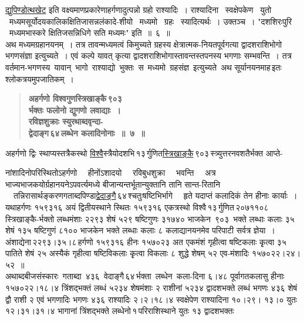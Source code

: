 \documentclass[11pt, openany]{book}
\begin{document}
\hyperref[1.6]{द्युपिण्डोत्थखेट} \;इति \;वक्ष्यमाणप्रकारेणाहर्गणादुत्पन्नो \;ग्रहो \;राश्यादिः~। राश्यादिना ~स्वक्षेपकेण ~युतो ~मध्यमसूर्योदयकालिकक्षितिजासन्नलंकादे-शीयो ~मध्यमो ~ग्रहः ~स्यादित्यर्थः~। उक्तञ्च~। "{\color{violet}दशशिरःपुरि ~मध्यमभास्करे क्षितिजसन्निधिगे सति मध्यमः}" इति~॥~६~॥\\

अथ मध्यमग्रहानयनम्~। तत्र तावन्मध्यमत्वं किमुच्यते ग्रहस्य क्षेत्रात्मक-नियतपूर्वगत्या द्वादशराशिभोगो भगणसंज्ञा इत्युच्यते~। एवं कल्पे यावत् कृत्या द्वादशराशिभोगास्तावन्तस्तपनस्य भगणाः सम्भवन्ति~। तत्र वर्तमान-भगणस्य \,यावान् \,भागो \,राश्याद्यो \,भुक्तः \,स \,मध्यमो \,ग्रहसंज्ञ \,इत्युच्यते \,अथ सूर्यानयनमाह\textendash \,इतः श्लोकत्रयमुपजातिकम्~।

 \label{1.7}
\begin{quote}
{\large \textbf{{\color{purple}अहर्गणो विश्वगुणस्त्रिखाङ्कै\textendash \,९०३\textendash \\
र्भक्तः फलोनो द्युगणो लवाद्याः~।\\
रविज्ञशुक्राः स्युरथाब्दवृन्दा-\\
द्वेदाङ्ग\textendash \,६४\textendash \,लब्धेन कलादिनोनाः~॥~७~॥}}}
\end{quote}

अहर्गणो द्विः स्थाप्यस्तत्रैकस्थो \hyperref[1.7]{विश्वै}स्त्रैयोदशभि\textendash \,१३\textendash \,र्गुणित\hyperref[1.7]{स्त्रिखाङ्कै}\textendash \,९०३\textendash \,स्त्र्युत्तरनवशतैर्भक्त आप्ते-

\newpage

\noindent नांशादिनोपरिस्थितोऽहर्गणो ~~हीनोंऽशादयो ~~रविबुधशुक्रा ~~भवन्ति ~~अत्र भाज्यभाजकयोर्ग्रहानयनेऽपवर्त्यमध्ये बीजान्यन्तर्भूतान्युक्तानि तानि सान्त-रितानि ~~तन्निरासार्थङ्करणगताब्दपिण्डा\hyperref[1.7]{द्वेदाङ्गै}\textendash \,६४\textendash \,श्चतुःषष्टिभिर्भागे ~~हृते यदाप्तं कलादिकं तेन हीनाः कार्याः~। यथाहर्गणः १५९३१६ अयं द्वितीयस्थाने स्थितः १५९३१६ एकत्रस्थो विश्वै\textendash \,१३\textendash \,र्गुणित\textendash \,२०७११०८\textendash \,स्त्रिखाङ्कै-र्भक्तो \;लब्धमंशाः \;२२९३ \;शेषं \;५२९ \;षष्टिगुणः \;३१७४० \;भाजकेन \,९०३ \,भक्ते लब्धाः कलाः ३५ शेषं १३५ षष्टिगुणं ८१०० भाजकेन भक्ते लब्धाः कलाः ८ कलाद्यानयनमेव परिपाटी सर्वत्र ज्ञेया~। अंशाद्येना\textendash \,२२९३।३५।८\textendash \,हर्गणो १५९३१६ हीनः १५७०२३ अत एकमंशं गृहीत्वा षष्टिकलाः कृृत्वा ३५ पातिते शेषं २५ अस्यैकं गृहीत्वा षष्टिविकलाः कृृत्वा विकलाः ८ शुद्धे शेषम् ५२ एव-मंशादिः १५७०२२।२४।५२~॥\\

अथाब्दबीजसंस्कारः\textendash ~गताब्दा \,४३६ \,वेदाङ्गै\textendash \,६४\textendash \,र्भक्ता \,लब्धेन \,कला-दिना ६।४८ पूर्वागतकलासु हीनाः १५७०२२।१८।४ त्रिंशद्भक्तं लब्धं ५२३४ शेषमंशाः २ राशीनां ५२३४ द्वादशभक्ते लब्धं भगणः ४३६ शेषं द्वौ राशी २ एवं भगणादिः भगणः ४३६ राश्यादिः २।२।१८।४ स्वक्षेपेण राश्यादिना १०।२९। १३।० \;युतः \;१२।३१।३१।४ \;भागानां \;त्रिंशद्भक्ते \;लब्धेनो\textendash \,१\textendash \,परिराशिस्थाने युतः १३ द्वादशभक्तः
\end{document}
